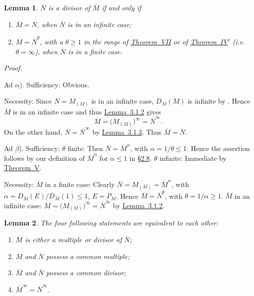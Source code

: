 \documentclass[b5paper,twoside]{article}
\newcommand{\secref}[2]{\hyperref[#1]{\mbox{\S#2}}}
\newcommand{\thmref}[2]{\hyperref[#1]{\mbox{Theorem~#2}}}
\newcommand{\lemref}[2]{\hyperref[#1]{\mbox{Lemma~#2}}}
\theoremstyle{mvnplain}
\newtheorem{lemma}{Lemma}[section]
\renewenvironment{proof}[1][Proof]{%
  \par\addvspace{0.35\baselineskip}%
  \noindent\textit{#1.}\ \normalfont\ignorespaces
}{%
  \par\addvspace{0.35\baselineskip}%
}
\newcommand{\M}{\mathbf M}
\newcommand{\N}{\mathbf N}
\def\M{M}%
\def\N{N}%
\def\mathfrak#1{#1}%
\begin{document}
\begin{lemma}\label{lem:3.1.4}
\(\overline{\N}\) is a divisor of \(\overline{\M}\) if and only if
\begin{enumerate}[label={}]
\item[\(\alpha\))] \(\overline{\M}=\overline{\N}\), when \(\overline{\N}\) is in an
infinite case;
\item[\(\beta\))] \(\overline{\M}=\overline{\N}^{\theta}\), with a \(\theta\geq1\) in
the range of \thmref{thm:VII}{VII} or of \thmref{thm:IV-prime}{IV$'$}
(i.e. \(\theta=\infty\)), when \(\overline{\N}\) is in a finite case.
\end{enumerate}
\end{lemma}

\begin{proof}
Ad \(\alpha\)). Sufficiency: Obvious.

Necessity: Since
\(\overline{\N}=\overline{\M_{(\mathfrak M)}}\) is in an infinite case,
\(D_{\M}(\mathfrak M)\) is infinite by
\cite[p.~189, Lemma~11.4.3]{ref5}. Hence \(\overline{\M}\) is in an infinite
case and thus \lemref{lem:3.1.2}{3.1.2} gives
\[
  \overline{\M}
  =\bigl(\overline{\M_{(\mathfrak M)}}\bigr)^\infty
  =\overline{\N}^{\infty}.
\]
On the other hand, \(\overline{\N}=\overline{\N}^{\infty}\) by
\lemref{lem:3.1.3}{3.1.3}. Thus \(\overline{\M}=\overline{\N}\).

Ad \(\beta\)). Sufficiency: \(\theta\) finite: Then
\(\overline{\N}=\overline{\M}^{\alpha}\), with
\(\alpha=1/\theta\leq1\). Hence the assertion follows by our definition of
\(\overline{\M}^{\alpha}\) for \(\alpha\leq1\) in
\secref{sec:2.8}{2.8}. \(\theta\) infinite: Immediate by
\thmref{thm:V}{V}.

Necessity: \(\overline{\M}\) in a finite case: Clearly
\(\overline{\N}=\overline{\M_{(\mathfrak M)}}=\overline{\M}^{\alpha}\),
with \(\alpha=D_{\M}(E)/D_{\M}(1)\leq1\),
\(E=P_{\mathfrak M}\). Hence
\(\overline{\M}=\overline{\N}^{\theta}\), with
\(\theta=1/\alpha\geq1\). \(\overline{\M}\) in an infinite case:
\(\overline{\M}=\bigl(\overline{\M_{(\mathfrak M)}}\bigr)^\infty
=\overline{\N}^{\infty}\) by \lemref{lem:3.1.2}{3.1.2}.
\end{proof}

\begin{lemma}\label{lem:3.1.5}
The four following statements are equivalent to each other:
\begin{enumerate}[label={}]
\item[\(\alpha\))] \(\overline{\M}\) is either a multiple or divisor of
\(\overline{\N}\);
\item[\(\beta\))] \(\overline{\M}\) and \(\overline{\N}\) possess a common multiple;
\item[\(\gamma\))] \(\overline{\M}\) and \(\overline{\N}\) possess a common divisor;
\item[\(\delta\))] \(\overline{\M}^{\infty}=\overline{\N}^{\infty}\).
\end{enumerate}
\end{lemma}
\end{document}
